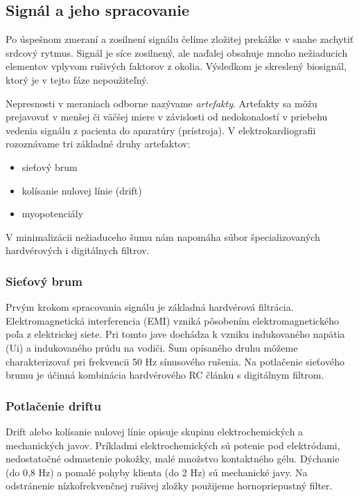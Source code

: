 \documentclass[titlepage,12pt]{article}
\begin{document}
\subsection{Signál a jeho spracovanie}
Po úspešnom zmeraní a zosilnení signálu čelíme zložitej prekážke v snahe zachytiť srdcový rytmus. Signál je síce zosilnený, ale naďalej obsahuje mnoho nežiaducich elementov vplyvom rušivých faktorov z okolia. Výsledkom je skreslený biosignál, ktorý je v tejto fáze nepoužiteľný.

Nepresnosti v meraniach odborne nazývame \emph{artefakty}. Artefakty sa môžu prejavovať \linebreak v menšej či väčšej miere v závislosti od nedokonalostí v priebehu vedenia signálu z pacienta do aparatúry (prístroja). V elektrokardiografii rozoznávame tri základné druhy artefaktov:
\begin{itemize}
	\item sieťový brum
	\item kolísanie nulovej línie (drift)
	\item myopotenciály
\end{itemize}

V minimalizácii nežiaduceho šumu nám napomáha súbor špecializovaných hardvérových \linebreak i digitálnych filtrov.

\subsubsection{Sieťový brum}
Prvým krokom spracovania signálu je základná hardvérová filtrácia. Elektromagnetická interferencia (EMI) vzniká pôsobením  elektromagnetického poľa z elektrickej siete. Pri tomto jave dochádza k vzniku indukovaného napätia (Ui) a indukovaného prúdu na vodiči. Šum opísaného druhu môžeme charakterizovať pri frekvencii 50 Hz sínusového rušenia. Na potlačenie sieťového brumu je účinná kombinácia hardvérového RC článku s digitálnym filtrom. 

\subsubsection{Potlačenie driftu}
Drift alebo kolísanie nulovej línie opisuje skupinu elektrochemických a mechanických javov. Príkladmi elektrochemických sú potenie pod elektródami, nedostatočné odmastenie pokožky, malé množstvo kontaktného gélu. Dýchanie (do 0,8 Hz) a pomalé pohyby klienta (do 2 Hz) sú mechanické javy. Na odstránenie nízkofrekvenčnej rušivej zložky použijeme hornopriepustný filter.
\end{document}
